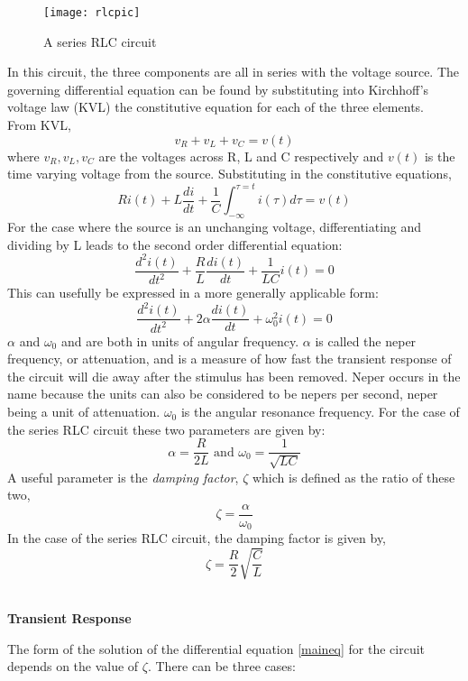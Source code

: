 \documentclass{article}
\begin{document}
\begin{figure}[ht]
\centering
\texttt{[image: rlcpic]}
\caption{A series RLC circuit}
\end{figure}
In this circuit, the three components are all in series with the voltage source. The governing differential equation can be found by substituting into Kirchhoff's voltage law (KVL) the constitutive equation for each of the three elements.
\\From KVL,\\
\[v_R + v_L + v_C = v(t)\]
where $v_R, v_L, v_C$  are the voltages across R, L and C respectively and $v(t)$ is the time varying voltage from the source. Substituting in the constitutive equations,\\
\[Ri(t) + L\frac{di}{dt} + \frac{1}{C}\int_{-\infty}^{\tau=t}i(\tau)d\tau = v(t)\]
For the case where the source is an unchanging voltage, differentiating and dividing by L leads to the second order differential equation:
\[\frac{d^2i(t)}{dt^2}+\frac{R}{L}\frac{di(t)}{dt} + \frac{1}{LC}i(t) = 0\]
This can usefully be expressed in a more generally applicable form:
\begin{equation}
\frac{d^2i(t)}{dt^2}+2\alpha\frac{di(t)}{dt} + \omega_0^2i(t) = 0 \label{maineq}
\end{equation}
$\alpha$ and $\omega_0$ and  are both in units of angular frequency. $\alpha$ is called the neper frequency, or attenuation, and is a measure of how fast the transient response of the circuit will die away after the stimulus has been removed. Neper occurs in the name because the units can also be considered to be nepers per second, neper being a unit of attenuation. $\omega_0$  is the angular resonance frequency.
For the case of the series RLC circuit these two parameters are given by:\\
\[\alpha = \frac{R}{2L} \text{ and } \omega_0=\frac{1}{\sqrt{LC}}\]
A useful parameter is the \textit{damping factor}, $\zeta$ which is defined as the ratio of these two,\\
\[\zeta=\frac{\alpha}{\omega_0}\]
In the case of the series RLC circuit, the damping factor is given by,\\
\[\zeta=\frac{R}{2}\sqrt{\frac{C}{L}} \]\\
\pagebreak
\begin{center}
\textbf{Transient Response}
\end{center}
The form of the solution of the differential equation \eqref{maineq} for the circuit depends on the value of $\zeta$. There can be three cases:\\
\end{document}
